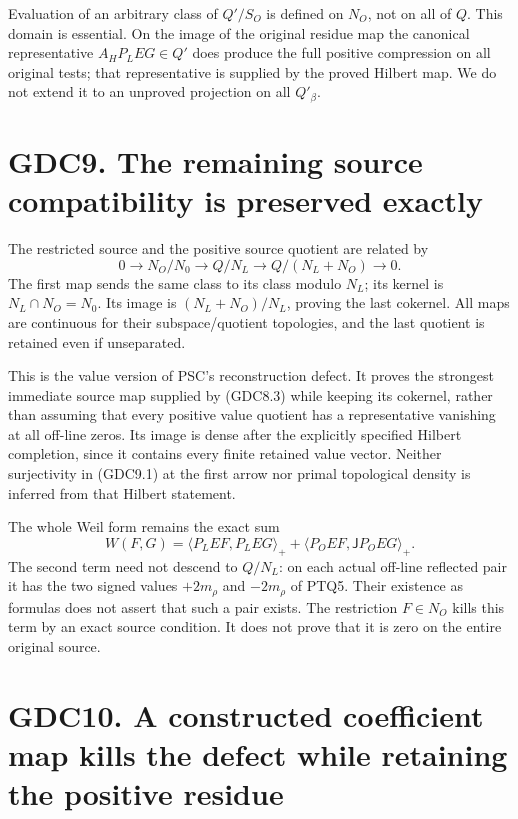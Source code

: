 Evaluation of an arbitrary class of \(Q'/S_O\) is defined on \(N_O\),
not on all of \(Q\). This domain is essential. On the image of the
original residue map the canonical representative \(A_HP_LEG\in Q'\)
does produce the full positive compression on all original tests; that
representative is supplied by the proved Hilbert map. We do not extend
it to an unproved projection on all \(Q'_\beta\).

\section{GDC9. The remaining source compatibility is preserved
exactly}\label{gdc9.-the-remaining-source-compatibility-is-preserved-exactly}

The restricted source and the positive source quotient are related by \[
0\to N_O/N_0\longrightarrow Q/N_L
\longrightarrow Q/(N_L+N_O)\to0.
\tag{GDC9.1}
\] The first map sends the same class to its class modulo \(N_L\); its
kernel is \(N_L\cap N_O=N_0\). Its image is \((N_L+N_O)/N_L\), proving
the last cokernel. All maps are continuous for their subspace/quotient
topologies, and the last quotient is retained even if unseparated.

This is the value version of PSC's reconstruction defect. It proves the
strongest immediate source map supplied by (GDC8.3) while keeping its
cokernel, rather than assuming that every positive value quotient has a
representative vanishing at all off-line zeros. Its image is dense after
the explicitly specified Hilbert completion, since it contains every
finite retained value vector. Neither surjectivity in (GDC9.1) at the
first arrow nor primal topological density is inferred from that Hilbert
statement.

The whole Weil form remains the exact sum \[
W(F,G)=\langle P_LEF,P_LEG\rangle_+
+\langle P_OEF,\mathsf JP_OEG\rangle_+.
\tag{GDC9.2}
\] The second term need not descend to \(Q/N_L\): on each actual
off-line reflected pair it has the two signed values \(+2m_\rho\) and
\(-2m_\rho\) of PTQ5. Their existence as formulas does not assert that
such a pair exists. The restriction \(F\in N_O\) kills this term by an
exact source condition. It does not prove that it is zero on the entire
original source.

\section{GDC10. A constructed coefficient map kills the defect while
retaining the positive
residue}\label{gdc10.-a-constructed-coefficient-map-kills-the-defect-while-retaining-the-positive-residue}

